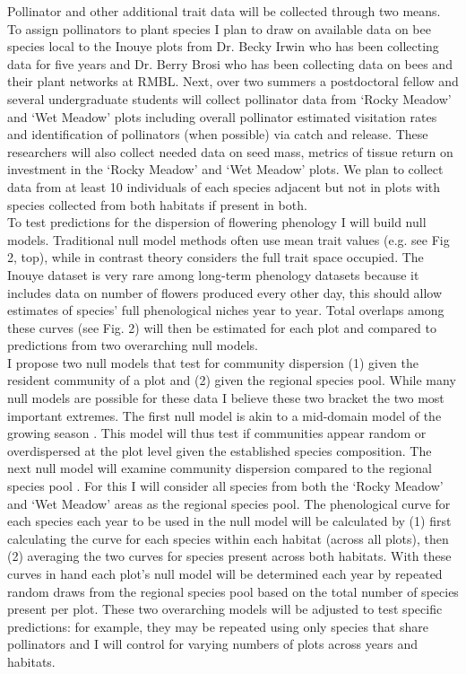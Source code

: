 \documentclass[12pt,a4paper,oneside]{article}
\begin{document}
Pollinator and other additional trait data will be collected through two means. To assign pollinators to plant species I plan to draw on available data on bee species local to the Inouye plots from Dr. Becky Irwin who has been collecting data for five years and Dr. Berry Brosi who has been collecting data on bees and their plant networks at RMBL. Next, over two summers a postdoctoral fellow and several undergraduate students will collect pollinator data from `Rocky Meadow' and `Wet Meadow' plots including overall pollinator estimated visitation rates and identification of pollinators (when possible) via catch and release. These researchers will also collect needed data on seed mass, metrics of tissue return on investment \citep{handbook2013} in the `Rocky Meadow' and `Wet Meadow' plots. We plan to collect data from at least 10 individuals of each species adjacent but not in plots with species collected from both habitats if present in both. 
\vspace{1.5ex}\\
To test predictions for the dispersion of flowering phenology I will build null models. Traditional null model methods often use mean trait values (e.g. see Fig 2, top), while in contrast theory considers the full trait space occupied. The Inouye dataset is very rare among long-term phenology datasets because it includes data on number of flowers produced every other day, this should allow estimates of species' full phenological niches year to year. Total overlaps among these curves (see Fig. 2) will then be estimated for each plot and compared to predictions from two overarching null models.
\vspace{1.5ex}\\
I propose two null models that test for community dispersion (1) given the resident community of a plot and (2) given the regional species pool. While many null models are possible for these data I believe these two bracket the two most important extremes. The first null model is akin to a mid-domain model of the growing season \citep{Morales:2005ex}. This model will thus test if communities appear random or overdispersed at the plot level given the established species composition. The next null model will examine community dispersion compared to the regional species pool \citep{poole1979}. For this I will consider all species from both the `Rocky Meadow' and `Wet Meadow' areas as the regional species pool. The phenological curve for each species each year to be used in the null model will be calculated by (1) first calculating the curve for each species within each habitat (across all plots), then (2) averaging the two curves for species present across both habitats. With these curves in hand each plot's null model will be determined each year by repeated random draws from the regional species pool based on the total number of species present per plot. These two overarching models will be adjusted to test specific predictions: for example, they may be repeated using only species that share pollinators and I will control for varying numbers of plots across years and habitats.
\end{document}
